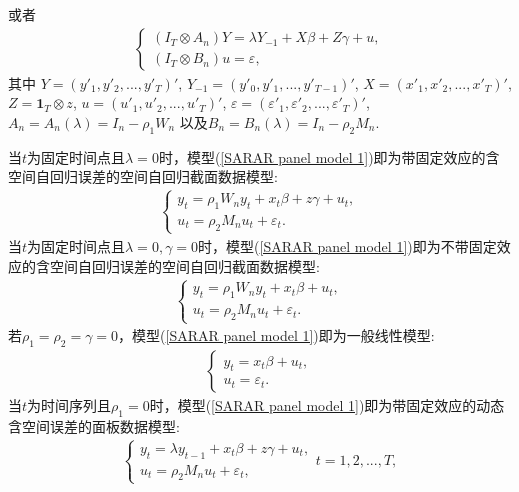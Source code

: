 \documentclass[cs4size]{article}
\def\nn{\nonumber}
\def\bea{\begin{eqnarray}}
\def\eea{\end{eqnarray}}
\begin{document}
或者
\bea
\begin{cases}
(I_T \otimes A_n)Y=\lambda Y_{-1}+X\beta +Z\gamma+u,\\
(I_T \otimes B_n)u=\varepsilon,
\nn\end{cases}  \label{SARAR panel model 2}
\eea
其中 $Y=(y'_1,y'_2,...,y'_T)'$, $Y_{-1}=(y'_0,y'_1,...,y'_{T-1})'$, $X=(x'_1,x'_2,...,x'_T)'$, $Z={\mathbf 1}_T \otimes z$, $u=(u'_1,u'_2,...,u'_T)'$, $\varepsilon=(\varepsilon'_1,\varepsilon'_2,...,\varepsilon'_T)'$, $A_n=A_n(\lambda)=I_n-\rho_1 W_n$ 以及$B_n=B_n(\lambda)=I_n-\rho_2 M_n$.

当$t$为固定时间点且$\lambda = 0$时，模型(\ref{SARAR panel model 1})即为{\kaishu 带固定效应的含空间自回归误差的空间自回归截面数据模型}:
\bea
\begin{cases}
y_t= \rho_1 W_n y_t+x_{t}\beta +z\gamma+u_t,\\
u_t = \rho_2 M_n u_t + \varepsilon_t.
\end{cases}  \label{SARAR model 1}
\nn\eea
当$t$为固定时间点且$\lambda = 0, \gamma=0$时，模型(\ref{SARAR panel model 1})即为{\kaishu 不带固定效应的含空间自回归误差的空间自回归截面数据模型}:
\bea
\begin{cases}
y_t= \rho_1 W_n y_t+x_{t}\beta + u_t,\\
u_t = \rho_2 M_n u_t + \varepsilon_t.
\end{cases}  \label{SARAR model 2}
\eea
若$\rho_1 = \rho_2 = \gamma =0$，模型(\ref{SARAR panel model 1})即为{\kaishu 一般线性模型}:
\bea
\begin{cases}
y_t=  x_{t}\beta + u_t,\\
u_t =   \varepsilon_t.
\end{cases}  \label{linear model}
\nn\eea
当$t$为时间序列且$\rho_1 =  0$时，模型(\ref{SARAR panel model 1})即为{\kaishu 带固定效应的动态含空间误差的面板数据模型}:
\bea
\begin{cases}
y_t=\lambda y_{t-1}+x_{t}\beta +z\gamma+u_t,\\
u_t = \rho_2 M_n u_t + \varepsilon_t,
\end{cases} t=1,2,...,T, \label{SEM panel model 1}
\nn\eea
\end{document}
